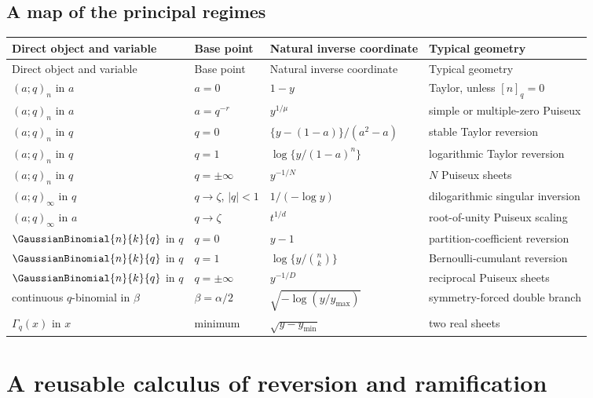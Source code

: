 \documentclass[11pt,oneside]{book}
\theoremstyle{definition}
\theoremstyle{remark}
\begin{document}
\section{A map of the principal regimes}
\begin{longtable}{>{\raggedright\arraybackslash}p{}
                  >{\raggedright\arraybackslash}p{}
                  >{\raggedright\arraybackslash}p{}
                  >{\raggedright\arraybackslash}p{}}
\toprule
Direct object and variable & Base point & Natural inverse coordinate & Typical geometry\\
\midrule
\endfirsthead
\toprule
Direct object and variable & Base point & Natural inverse coordinate & Typical geometry\\
\midrule
\endhead
$(a;q)_n$ in $a$ & $a=0$ & $1-y$ & Taylor, unless $[n]_q=0$\\
$(a;q)_n$ in $a$ & $a=q^{-r}$ & $y^{1/\mu}$ & simple or multiple-zero Puiseux\\
$(a;q)_n$ in $q$ & $q=0$ & $\{y-(1-a)\}/(a^2-a)$ & stable Taylor reversion\\
$(a;q)_n$ in $q$ & $q=1$ & $\log\{y/(1-a)^n\}$ & logarithmic Taylor reversion\\
$(a;q)_n$ in $q$ & $q=\pm\infty$ & $y^{-1/N}$ & $N$ Puiseux sheets\\
$(a;q)_\infty$ in $q$ & $q\to\zeta$, $|q|<1$ & $1/(-\log y)$ & dilogarithmic singular inversion\\
$(a;q)_\infty$ in $a$ & $q\to\zeta$ & $t^{1/d}$ & root-of-unity Puiseux scaling\\
$\GaussianBinomial{n}{k}{q}$ in $q$ & $q=0$ & $y-1$ & partition-coefficient reversion\\
$\GaussianBinomial{n}{k}{q}$ in $q$ & $q=1$ & $\log\{y/\binom nk\}$ & Bernoulli-cumulant reversion\\
$\GaussianBinomial{n}{k}{q}$ in $q$ & $q=\pm\infty$ & $y^{-1/D}$ & reciprocal Puiseux sheets\\
continuous $q$-binomial in $\beta$ & $\beta=\alpha/2$ & $\sqrt{-\log(y/y_{\max})}$ & symmetry-forced double branch\\
$\Gamma_q(x)$ in $x$ & minimum & $\sqrt{y-y_{\min}}$ & two real sheets\\
\bottomrule
\end{longtable}

\chapter{A reusable calculus of reversion and ramification}
\end{document}
